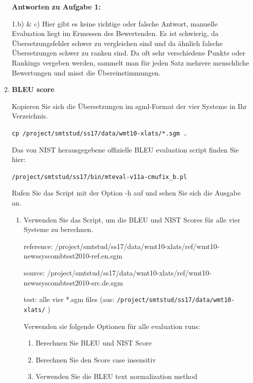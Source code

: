 \documentclass[12pt,fleqn]{article}
\begin{document}
\begin{enumerate}
\textbf{Antworten zu Aufgabe 1:} 

1.b) \& c) Hier gibt es keine richtige oder falsche Antwort, manuelle Evaluation liegt im Ermessen des Bewertenden.
Es ist schwierig, da Übersetzungsfehler schwer zu vergleichen sind und da ähnlich falsche Übersetzungen schwer zu ranken sind.
Da oft sehr verschiedene Punkte oder Rankings vergeben werden, sammelt man für jeden Satz mehrere menschliche Bewertungen und misst die Übereinstimmungen.


\vspace{0.5cm} 
\item \textbf{BLEU score} 

\vspace{0.5cm} 
Kopieren Sie sich die Übersetzungen im sgml-Format der vier Systeme in Ihr Verzeichnis.

\texttt{cp /project/smtstud/ss17/data/wmt10-xlats/*.sgm .} 

\vspace{0.5cm} 
Das von NIST herausgegebene offizielle BLEU evaluation script finden Sie hier:

\texttt{/project/smtstud/ss17/bin/mteval-v11a-cmufix\_b.pl} 

\vspace{0.5cm} 
Rufen Sie das Script mit der Option -h auf und sehen Sie sich die Ausgabe an.

\vspace{0.5cm} 
\begin{enumerate} 
\item Verwenden Sie das Script, um die BLEU und NIST Scores für alle vier Systeme zu berechnen.

\vspace{0.5cm} 
reference: /project/smtstud/ss17/data/wmt10-xlats/ref/wmt10-newssyscombtest2010-ref.en.sgm

source:     
/project/smtstud/ss17/data/wmt10-xlats/ref/wmt10-newssyscombtest2010-src.de.sgm

test:            alle vier *.sgm files (aus: \texttt{/project/smtstud/ss17/data/wmt10-xlats/} )

\vspace{0.5cm} 
Verwenden sie folgende Optionen für alle evaluation runs:

\vspace{0.5cm} 
\begin{enumerate} 
\item Berechnen Sie BLEU und NIST Score
\item Berechnen Sie den Score case insensitiv
\item Verwenden Sie die BLEU text normalization method
\end{enumerate} 


\end{enumerate}
\end{enumerate}
\end{document}
